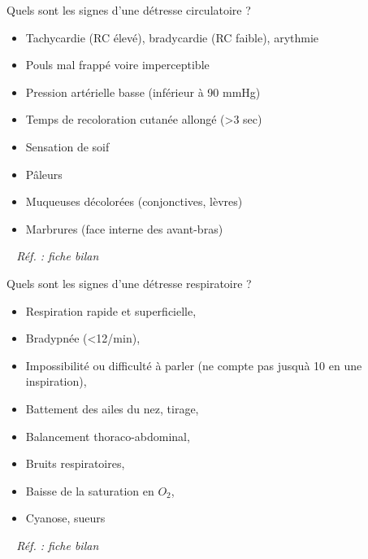 \documentclass[grid,avery5371,landscape]{flashcards}
\makeatletter
\newcounter{nocarte}
\newcommand{\categ}[1]{%
  \def\@categ{#1}%
  \setcounter{nocarte}{0}%
}
\newcommand{\source}[1]{%
  \medskip
  \itshape%
   ~ \hfill Réf. : #1}
\makeatother
\begin{document}
\color[HTML]{FF6D01}
\categ{PSE+}
\begin{flashcard}[bilan]{
  Quels sont les signes d'une détresse circulatoire ?   }
      \begin{itemize}        
 \item Tachycardie (RC élevé), bradycardie (RC faible), arythmie         
\item Pouls mal frappé voire imperceptible        
\item Pression artérielle basse (inférieur à 90 mmHg)         
\item Temps de recoloration cutanée allongé (>3 sec)         
\item Sensation de soif         
\item Pâleurs         
\item Muqueuses décolorées (conjonctives, lèvres)        
 \item Marbrures (face interne des avant-bras)     
\end{itemize}
  \source{fiche bilan}
\end{flashcard}


\color[HTML]{FF6D01}
\categ{PSE+}
\begin{flashcard}[bilan]{
 Quels sont les signes d'une détresse respiratoire ?   }
  \begin{itemize}
        \item Respiration rapide et superficielle, 
        \item Bradypnée (<12/min), 
        \item Impossibilité ou difficulté à parler (ne compte pas jusquà 10 en une inspiration), 
        \item Battement des ailes du nez, tirage, 
        \item Balancement thoraco-abdominal, 
        \item Bruits respiratoires, 
        \item Baisse de la saturation en $O_2$,
        \item Cyanose, sueurs
    \end{itemize}
  \source{fiche bilan}
\end{flashcard}
\end{document}
